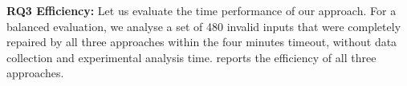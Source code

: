 \documentclass[sigconf,review,anonymous]{acmart}
\newcounter{todocounter}
\newcommand{\todo}[1]{\marginpar{$|$}\textcolor{red}{\stepcounter{todocounter}\footnote[\thetodocounter]{\textcolor{red}{\textbf{TODO }}\textit{#1}}}}
\newcommand{\recheck}[1]{\textcolor{red}{#1}}
\renewcommand{\todo}[1]{}
\newcommand{\approach}{\textsc{FSynth}\xspace}
\begin{document}
\noindent
\textbf{RQ3 Efficiency:} %
Let us evaluate the time performance of our approach.
For a balanced evaluation, we
analyse a set of 480 invalid inputs %
that were completely repaired by all three approaches within %
the four minutes timeout, %
without %
data collection and %
experimental
analysis time.
reports the efficiency of all three approaches. %

\end{document}
